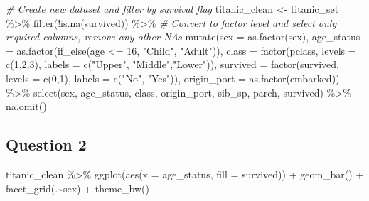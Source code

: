 \documentclass[
]{article}
\newenvironment{Shaded}{\begin{snugshade}}{\end{snugshade}}
\newcommand{\AttributeTok}[1]{\textcolor[rgb]{0.77,0.63,0.00}{#1}}
\newcommand{\CommentTok}[1]{\textcolor[rgb]{0.56,0.35,0.01}{\textit{#1}}}
\newcommand{\DecValTok}[1]{\textcolor[rgb]{0.00,0.00,0.81}{#1}}
\newcommand{\FunctionTok}[1]{\textcolor[rgb]{0.00,0.00,0.00}{#1}}
\newcommand{\NormalTok}[1]{#1}
\newcommand{\OtherTok}[1]{\textcolor[rgb]{0.56,0.35,0.01}{#1}}
\newcommand{\SpecialCharTok}[1]{\textcolor[rgb]{0.00,0.00,0.00}{#1}}
\newcommand{\StringTok}[1]{\textcolor[rgb]{0.31,0.60,0.02}{#1}}
\begin{document}
\begin{Shaded}
\begin{Highlighting}[]
\CommentTok{\# Create new dataset and filter by survival flag}
\NormalTok{titanic\_clean }\OtherTok{\textless{}{-}}\NormalTok{ titanic\_set }\SpecialCharTok{\%\textgreater{}\%}
  \FunctionTok{filter}\NormalTok{(}\SpecialCharTok{!}\FunctionTok{is.na}\NormalTok{(survived)) }\SpecialCharTok{\%\textgreater{}\%} 
\CommentTok{\# Convert to factor level and select only required columns, remove any other NA\textquotesingle{}s}
    \FunctionTok{mutate}\NormalTok{(}\AttributeTok{sex =} \FunctionTok{as.factor}\NormalTok{(sex), }
           \AttributeTok{age\_status =} \FunctionTok{as.factor}\NormalTok{(}\FunctionTok{if\_else}\NormalTok{(age }\SpecialCharTok{\textless{}=} \DecValTok{16}\NormalTok{, }\StringTok{"Child"}\NormalTok{, }\StringTok{"Adult"}\NormalTok{)),}
         \AttributeTok{class =} \FunctionTok{factor}\NormalTok{(pclass, }\AttributeTok{levels =} \FunctionTok{c}\NormalTok{(}\DecValTok{1}\NormalTok{,}\DecValTok{2}\NormalTok{,}\DecValTok{3}\NormalTok{), }\AttributeTok{labels =} \FunctionTok{c}\NormalTok{(}\StringTok{"Upper"}\NormalTok{, }\StringTok{"Middle"}\NormalTok{,}\StringTok{"Lower"}\NormalTok{)), }
           \AttributeTok{survived =} \FunctionTok{factor}\NormalTok{(survived, }\AttributeTok{levels =} \FunctionTok{c}\NormalTok{(}\DecValTok{0}\NormalTok{,}\DecValTok{1}\NormalTok{), }\AttributeTok{labels =} \FunctionTok{c}\NormalTok{(}\StringTok{"No"}\NormalTok{, }\StringTok{"Yes"}\NormalTok{)), }
           \AttributeTok{origin\_port =} \FunctionTok{as.factor}\NormalTok{(embarked)) }\SpecialCharTok{\%\textgreater{}\%}
  \FunctionTok{select}\NormalTok{(sex, age\_status, class, origin\_port, sib\_sp, parch, survived) }\SpecialCharTok{\%\textgreater{}\%}
  \FunctionTok{na.omit}\NormalTok{()}
\end{Highlighting}
\end{Shaded}

\hypertarget{question-2}{%
\subsection{Question 2}\label{question-2}}

\begin{Shaded}
\begin{Highlighting}[]
\NormalTok{titanic\_clean }\SpecialCharTok{\%\textgreater{}\%} 
  \FunctionTok{ggplot}\NormalTok{(}\FunctionTok{aes}\NormalTok{(}\AttributeTok{x =}\NormalTok{ age\_status, }\AttributeTok{fill =}\NormalTok{ survived)) }\SpecialCharTok{+} 
  \FunctionTok{geom\_bar}\NormalTok{() }\SpecialCharTok{+} 
  \FunctionTok{facet\_grid}\NormalTok{(.}\SpecialCharTok{\textasciitilde{}}\NormalTok{sex) }\SpecialCharTok{+} 
  \FunctionTok{theme\_bw}\NormalTok{()}
\end{Highlighting}
\end{Shaded}
\end{document}
